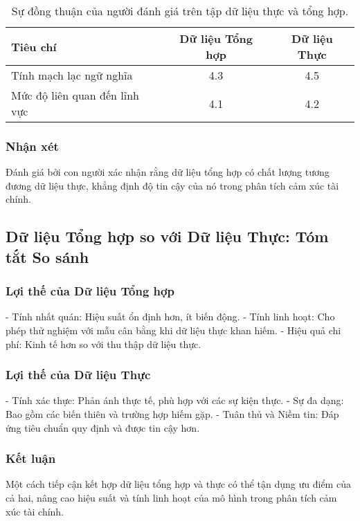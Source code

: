 \documentclass[a4paper,10pt]{article}
\begin{document}
\begin{table}[h]
    \renewcommand{\thetable}{16}
    \centering
    \caption{Sự đồng thuận của người đánh giá trên tập dữ liệu thực và tổng hợp.}
    \label{tab:agreement_human}
    \begin{tabular}{lcc}
        \hline
        Tiêu chí & Dữ liệu Tổng hợp & Dữ liệu Thực \\
        \hline
        Tính mạch lạc ngữ nghĩa       & 4.3 & 4.5 \\
        Mức độ liên quan đến lĩnh vực  & 4.1 & 4.2 \\
        \hline
    \end{tabular}
\end{table}


\subsubsection{Nhận xét} 

Đánh giá bởi con người xác nhận rằng dữ liệu tổng hợp có chất lượng tương đương dữ liệu thực, khẳng định độ tin cậy của nó trong phân tích cảm xúc tài chính.
\subsection{Dữ liệu Tổng hợp so với Dữ liệu Thực: Tóm tắt So sánh}

\subsubsection{Lợi thế của Dữ liệu Tổng hợp} 
- Tính nhất quán: Hiệu suất ổn định hơn, ít biến động.
- Tính linh hoạt: Cho phép thử nghiệm với mẫu cân bằng khi dữ liệu thực khan hiếm.
- Hiệu quả chi phí: Kinh tế hơn so với thu thập dữ liệu thực.

\subsubsection{Lợi thế của Dữ liệu Thực} 
- Tính xác thực: Phản ánh thực tế, phù hợp với các sự kiện thực.
- Sự đa dạng: Bao gồm các biến thiên và trường hợp hiếm gặp.
- Tuân thủ và Niềm tin: Đáp ứng tiêu chuẩn quy định và được tin cậy hơn.

\subsubsection{Kết luận} 

Một cách tiếp cận kết hợp dữ liệu tổng hợp và thực có thể tận dụng ưu điểm của cả hai, nâng cao hiệu suất và tính linh hoạt của mô hình trong phân tích cảm xúc tài chính.
\end{document}

